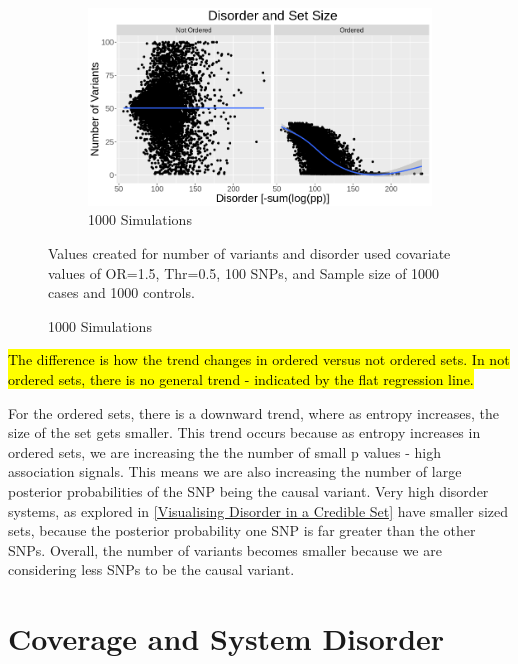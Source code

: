     
\begin{figure} \ContinuedFloat
    \centering
    \begin{subfigure}[]{\textwidth}
        \centering
        \includegraphics[width=\textwidth]{images/Size_and_Disorder_Charts/1000_sim.png}
        \caption{1000 Simulations}
        \label{}
    \end{subfigure}
    \label{}
\footnotesize
Values created for number of variants and disorder used covariate values of OR=1.5, Thr=0.5, 100 SNPs, and Sample size of 1000 cases and 1000 controls.
\end{figure}




\hl{The difference is how the trend changes in ordered versus not ordered sets. In not ordered sets, there is no general trend - indicated by the flat regression line.}

For the ordered sets, there is a downward trend, where as entropy increases, the size of the set gets smaller. This trend occurs because as entropy increases in ordered sets, we are increasing the the number of small p values - high association signals. This means we are also increasing the number of large posterior probabilities of the SNP being the causal variant. Very high disorder systems, as explored in \ref{Visualising Disorder in a Credible Set} have smaller sized sets, because the posterior probability one SNP is far greater than the other SNPs. Overall, the number of variants becomes smaller because we are considering less SNPs to be the causal variant. 


\section{Coverage and System Disorder} \label{Cov and Disorder}

